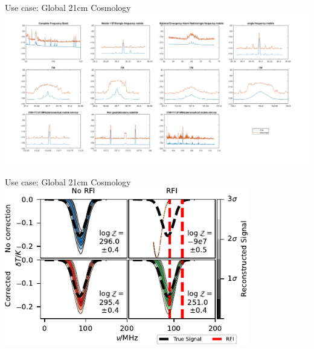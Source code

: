 \documentclass{beamer}
\begin{document}
\begin{frame}{Use case: Global 21cm Cosmology}
\centering
\includegraphics[width=1\textwidth]{Site Measurements March.jpg}
\end{frame}

\begin{frame}{Use case: Global 21cm Cosmology}
\centering
\includegraphics[width=0.8\textwidth]{4pane_reach_sidebar.pdf}
\end{frame}
\end{document}
